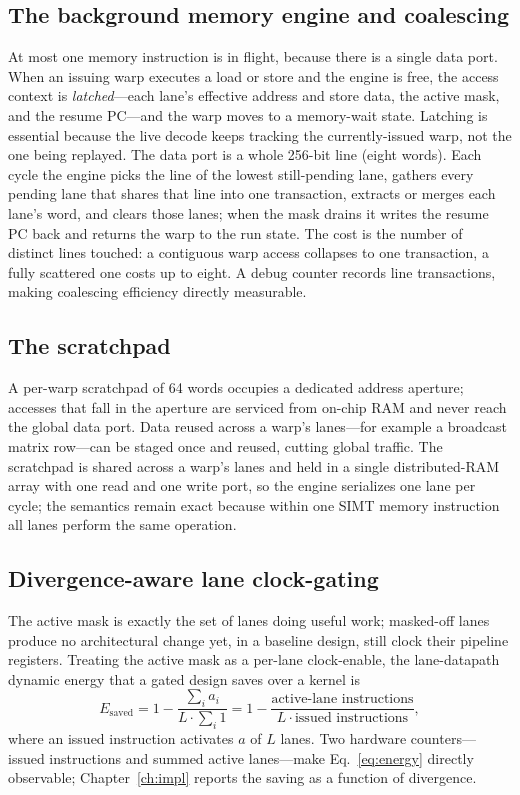 \documentclass[12pt,a4paper,oneside]{report}
\begin{document}
\subsection{The background memory engine and coalescing}
\label{sec:coalesce}
At most one memory instruction is in flight, because there is a single data port.
When an issuing warp executes a load or store and the engine is free, the access
context is \emph{latched}---each lane's effective address and store data, the
active mask, and the resume PC---and the warp moves to a memory-wait state.
Latching is essential because the live decode keeps tracking the currently-issued
warp, not the one being replayed. The data port is a whole 256-bit line (eight
words). Each cycle the engine picks the line of the lowest still-pending lane,
gathers every pending lane that shares that line into one transaction, extracts or
merges each lane's word, and clears those lanes; when the mask drains it writes
the resume PC back and returns the warp to the run state. The cost is the number
of distinct lines touched: a contiguous warp access collapses to one transaction,
a fully scattered one costs up to eight. A debug counter records line
transactions, making coalescing efficiency directly measurable.

\subsection{The scratchpad}
A per-warp scratchpad of 64 words occupies a dedicated address aperture; accesses
that fall in the aperture are serviced from on-chip RAM and never reach the global
data port. Data reused across a warp's lanes---for example a broadcast matrix
row---can be staged once and reused, cutting global traffic. The scratchpad is
shared across a warp's lanes and held in a single distributed-RAM array with one
read and one write port, so the engine serializes one lane per cycle; the
semantics remain exact because within one SIMT memory instruction all lanes
perform the same operation.

\subsection{Divergence-aware lane clock-gating}
\label{sec:gating}
The active mask is exactly the set of lanes doing useful work; masked-off lanes
produce no architectural change yet, in a baseline design, still clock their
pipeline registers. Treating the active mask as a per-lane clock-enable, the
lane-datapath dynamic energy that a gated design saves over a kernel is
\begin{equation}
E_{\text{saved}} = 1 - \frac{\sum_i a_i}{L\cdot\sum_i 1}
= 1 - \frac{\text{active-lane instructions}}{L\cdot\text{issued instructions}},
\label{eq:energy}
\end{equation}
where an issued instruction activates $a$ of $L$ lanes. Two hardware
counters---issued instructions and summed active lanes---make
Eq.~\eqref{eq:energy} directly observable; Chapter~\ref{ch:impl} reports the
saving as a function of divergence.
\end{document}
